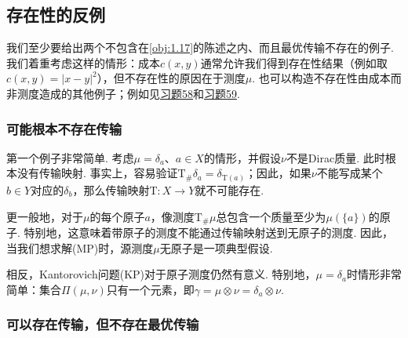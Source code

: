 \subsection{存在性的反例}\label{sec:1.4}

我们至少要给出两个不包含在\autoref{obj:1.17}的陈述之内、而且最优传输不存在的例子. 我们着重考虑这样的情形：成本$c(x,y)$通常允许我们得到存在性结果（例如取$c(x,y)=|x-y|^2$），但不存在性的原因在于测度$\mu$. 也可以构造不存在性由成本而非测度造成的其他例子；例如见\hyperref[ex:58]{习题58}和\hyperref[ex:59]{习题59}.

\subsubsection*{可能根本不存在传输}

第一个例子非常简单. 考虑$\mu=\delta_a$、$a\in X$的情形，并假设$\nu$不是Dirac质量. 此时根本没有传输映射. 事实上，容易验证$\mathrm{T}_\#\delta_a=\delta_{\mathrm{T}(a)}$；因此，如果$\nu$不能写成某个$b\in Y$对应的$\delta_b$，那么传输映射$\mathrm{T}:X\to Y$就不可能存在.

更一般地，对于$\mu$的每个原子$a$，像测度$\mathrm{T}_\#\mu$总包含一个质量至少为$\mu(\{a\})$的原子. 特别地，这意味着带原子的测度不能通过传输映射送到无原子的测度. 因此，当我们想求解(MP)时，源测度$\mu$无原子是一项典型假设.

相反，Kantorovich问题(KP)对于原子测度仍然有意义. 特别地，$\mu=\delta_a$时情形非常简单：集合$\Pi(\mu,\nu)$只有一个元素，即$\gamma=\mu\otimes\nu=\delta_a\otimes\nu$.

\subsubsection*{可以存在传输，但不存在最优传输}

